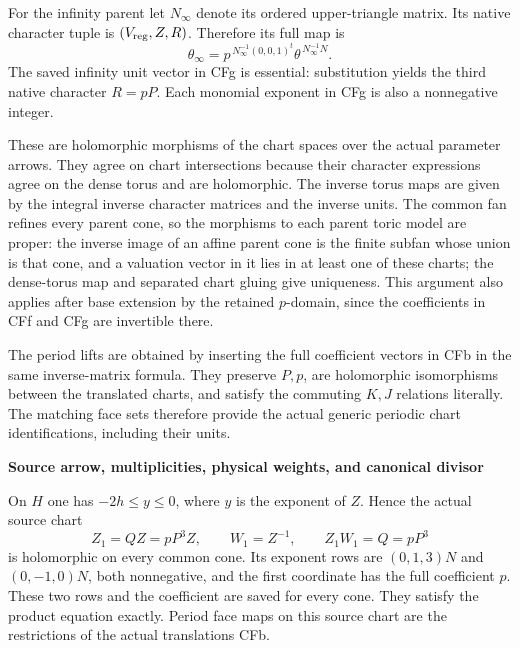 For the infinity parent let \(N_\infty\) denote its ordered upper-triangle matrix. Its native character tuple is \((V_{\rm reg},Z,R)\). Therefore its full map is
\[
 \theta_\infty
 =p^{\,N_\infty^{-1}(0,0,1)^t}
       \theta^{\,N_\infty^{-1}N}.                              \tag{CFg}
\]
The saved infinity unit vector in CFg is essential: substitution yields the third native character \(R=pP\). Each monomial exponent in CFg is also a nonnegative integer.

These are holomorphic morphisms of the chart spaces over the actual parameter arrows. They agree on chart intersections because their character expressions agree on the dense torus and are holomorphic. The inverse torus maps are given by the integral inverse character matrices and the inverse units. The common fan refines every parent cone, so the morphisms to each parent toric model are proper: the inverse image of an affine parent cone is the finite subfan whose union is that cone, and a valuation vector in it lies in at least one of these charts; the dense-torus map and separated chart gluing give uniqueness. This argument also applies after base extension by the retained \(p\)-domain, since the coefficients in CFf and CFg are invertible there.

The period lifts are obtained by inserting the full coefficient vectors in CFb in the same inverse-matrix formula. They preserve \(P,p\), are holomorphic isomorphisms between the translated charts, and satisfy the commuting \(K,J\) relations literally. The matching face sets therefore provide the actual generic periodic chart identifications, including their units.

\par

\medskip\noindent\textbf{Source arrow, multiplicities, physical weights, and canonical divisor}

\par\nobreak

On \(H\) one has \(-2h\le y\le0\), where \(y\) is the exponent of \(Z\). Hence the actual source chart
\[
 Z_1=QZ=pP^3Z,\qquad W_1=Z^{-1},\qquad Z_1W_1=Q=pP^3             \tag{CFh}
\]
is holomorphic on every common cone. Its exponent rows are
\((0,1,3)N\) and \((0,-1,0)N\), both nonnegative, and the first coordinate has the full coefficient \(p\). These two rows and the coefficient are saved for every cone. They satisfy the product equation exactly. Period face maps on this source chart are the restrictions of the actual translations CFb.

